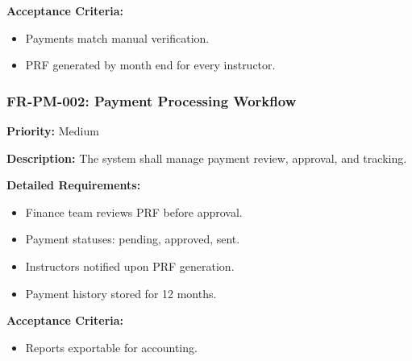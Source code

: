\textbf{Acceptance Criteria:}
\begin{itemize}
    \item Payments match manual verification.
    \item PRF generated by month end for every instructor.
\end{itemize}

\subsubsection{FR-PM-002: Payment Processing Workflow}
\textbf{Priority:} Medium  

\textbf{Description:} The system shall manage payment review, approval, and tracking.

\textbf{Detailed Requirements:}
\begin{itemize}
    \item Finance team reviews PRF before approval.
    \item Payment statuses: pending, approved, sent.
    \item Instructors notified upon PRF generation.
    \item Payment history stored for 12 months.
\end{itemize}

\textbf{Acceptance Criteria:}
\begin{itemize}
    \item Reports exportable for accounting.
\end{itemize}





